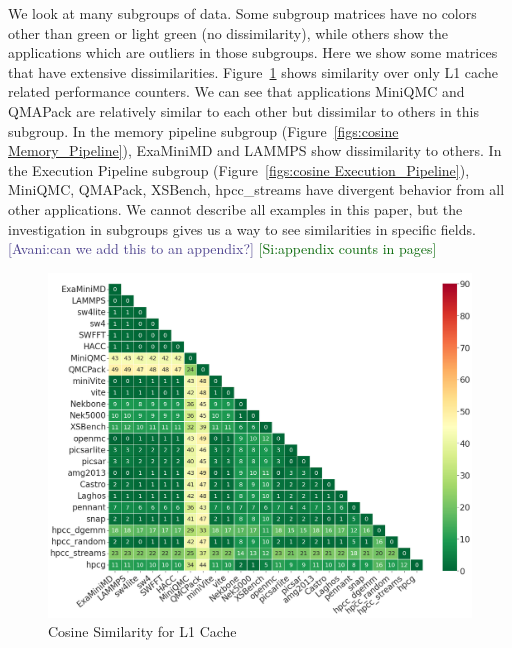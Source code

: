 \documentclass[conference]{IEEEtran}
\newcommand{\avani}[1]          {\textcolor{darkslateblue}{[Avani:#1]}}
\newcommand{\si}[1]           {\textcolor{darkgreen}{[Si:#1]}}
\begin{document}
We look at many subgroups of data.
Some subgroup matrices have no colors other than green or light green (no dissimilarity), while others show the applications which are outliers in those subgroups. 
Here we show some matrices that have extensive dissimilarities. Figure~\ref{figs:cosine L1_D_Cache} shows similarity over only L1 cache related performance counters. We can see that applications MiniQMC and QMAPack are relatively
similar to each other but dissimilar to others in this subgroup. In the memory pipeline subgroup (Figure~\ref{figs:cosine Memory_Pipeline}), ExaMiniMD and LAMMPS show dissimilarity to others. In the Execution Pipeline subgroup (Figure~\ref{figs:cosine Execution_Pipeline}), MiniQMC, QMAPack, XSBench, hpcc\_streams have divergent behavior from all
other applications.
We cannot describe all examples in this paper, but the investigation in subgroups gives us a way to see similarities in specific fields.\avani{can we add this to an appendix?} \si{appendix counts in pages}

\begin{figure}[ht]
\centering
\includegraphics[width=0.9\linewidth]{figs/L1_Cache_font20.png}
\caption{Cosine Similarity for L1 Cache }
\label{figs:cosine L1_D_Cache}
\end{figure}
\end{document}
